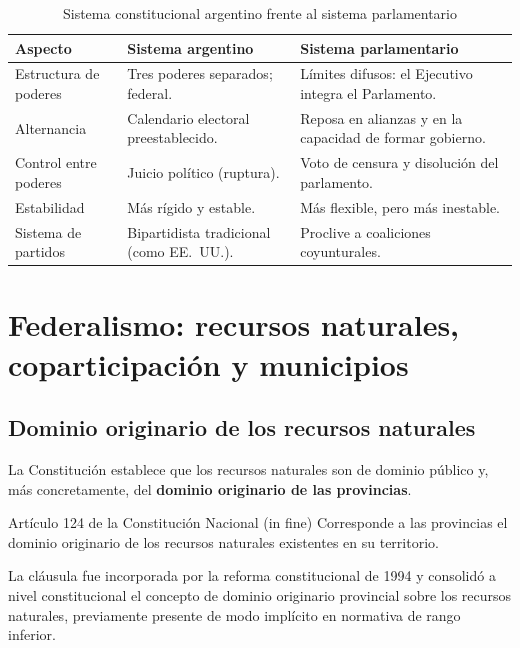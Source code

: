 \documentclass[12pt,oneside]{book}
\begin{document}
\begin{table}[H]
\centering
\caption{Sistema constitucional argentino frente al sistema parlamentario}
\begin{tabularx}{\textwidth}{Q{0.22\textwidth}YY}
\toprule
\textbf{Aspecto} & \textbf{Sistema argentino} & \textbf{Sistema parlamentario} \\
\midrule
Estructura de poderes & Tres poderes separados; federal. & Límites difusos: el Ejecutivo integra el Parlamento. \\
Alternancia & Calendario electoral preestablecido. & Reposa en alianzas y en la capacidad de formar gobierno. \\
Control entre poderes & Juicio político (ruptura). & Voto de censura y disolución del parlamento. \\
Estabilidad & Más rígido y estable. & Más flexible, pero más inestable. \\
Sistema de partidos & Bipartidista tradicional (como EE.\ UU.). & Proclive a coaliciones coyunturales. \\
\bottomrule
\end{tabularx}
\end{table}

\chapter[Federalismo y municipios]{Federalismo: recursos naturales, coparticipación y municipios}

\section{Dominio originario de los recursos naturales}

La Constitución establece que los recursos naturales son de dominio público y, más concretamente, del \textbf{dominio originario de las provincias}.

\begin{norma}{Artículo 124 de la Constitución Nacional (in fine)}
Corresponde a las provincias el dominio originario de los recursos naturales existentes en su territorio.
\end{norma}

La cláusula fue incorporada por la reforma constitucional de 1994 y consolidó a nivel constitucional el concepto de dominio originario provincial sobre los recursos naturales, previamente presente de modo implícito en normativa de rango inferior.
\end{document}
